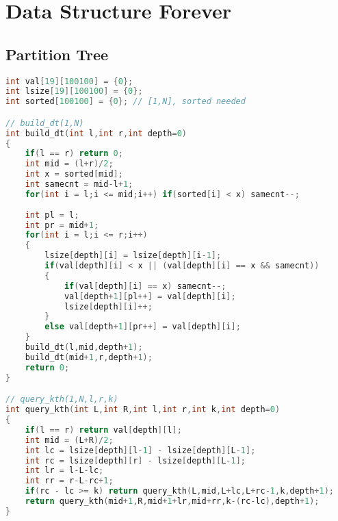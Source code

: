 \section{Data Structure Forever}
\subsection{Partition Tree}
\begin{lstlisting}[language=C++]
int val[19][100100] = {0};
int lsize[19][100100] = {0};
int sorted[100100] = {0}; // [1,N], sorted needed

// build_dt(1,N)
int build_dt(int l,int r,int depth=0)
{
	if(l == r) return 0;
	int mid = (l+r)/2;
	int x = sorted[mid];
	int samecnt = mid-l+1;
	for(int i = l;i <= mid;i++) if(sorted[i] < x) samecnt--;
	
	int pl = l;
	int pr = mid+1;
	for(int i = l;i <= r;i++)
	{
		lsize[depth][i] = lsize[depth][i-1];
		if(val[depth][i] < x || (val[depth][i] == x && samecnt))
		{
			if(val[depth][i] == x) samecnt--;
			val[depth+1][pl++] = val[depth][i];
			lsize[depth][i]++;
		}
		else val[depth+1][pr++] = val[depth][i];
	}
	build_dt(l,mid,depth+1);
	build_dt(mid+1,r,depth+1);
	return 0;
}

// query_kth(1,N,l,r,k)
int query_kth(int L,int R,int l,int r,int k,int depth=0)
{
	if(l == r) return val[depth][l];
	int mid = (L+R)/2;
	int lc = lsize[depth][l-1] - lsize[depth][L-1];
	int rc = lsize[depth][r] - lsize[depth][L-1];
	int lr = l-L-lc;
	int rr = r-L-rc+1;
	if(rc - lc >= k) return query_kth(L,mid,L+lc,L+rc-1,k,depth+1);
	return query_kth(mid+1,R,mid+1+lr,mid+rr,k-(rc-lc),depth+1);
}
\end{lstlisting}
